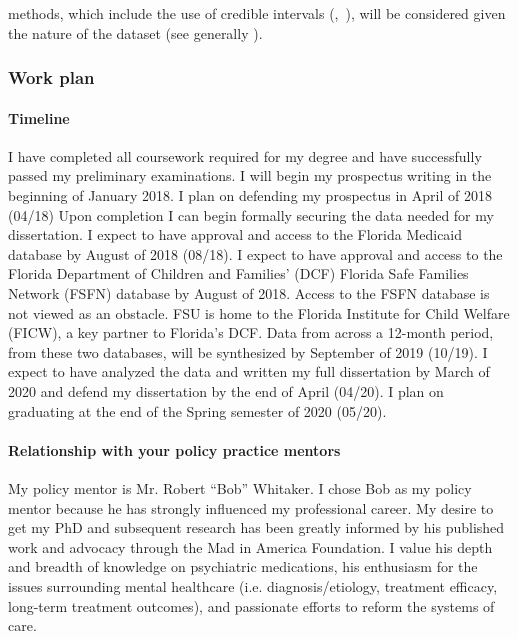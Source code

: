 \documentclass[twocolumn, issue, rga, authordate]{jote-new-article}
\begin{document}
methods, which include the use of credible intervals (,~\citeyear{Hoekstra2014}), will be considered given the nature of
the dataset (see generally  \citeyear{Berk1995}).


\subsubsection{Work plan}



\paragraph{Timeline}


I have completed all coursework required for my degree and have
successfully passed my preliminary examinations. I will begin my
prospectus writing in the beginning of January 2018. I plan on defending
my prospectus in April of 2018 (04/18) Upon completion I can begin
formally securing the data needed for my dissertation. I expect to have
approval and access to the Florida Medicaid database by August of 2018
(08/18). I expect to have approval and access to the Florida Department
of Children and Families' (DCF) Florida Safe Families Network (FSFN)
database by August of 2018. Access to the FSFN database is not viewed as
an obstacle. FSU is home to the Florida Institute for Child Welfare
(FICW), a key partner to Florida's DCF. Data from across a 12-month
period, from these two databases, will be synthesized by September of
2019 (10/19). I expect to have analyzed the data and written my full
dissertation by March of 2020 and defend my dissertation by the end of
April (04/20). I plan on graduating at the end of the Spring semester of
2020 (05/20).


\paragraph{Relationship with your policy practice mentors}


My policy mentor is Mr. Robert ``Bob'' Whitaker. I chose Bob as my
policy mentor because he has strongly influenced my professional career.
My desire to get my PhD and subsequent research has been greatly
informed by his published work and advocacy through the Mad in America
Foundation. I value his depth and breadth of knowledge on psychiatric
medications, his enthusiasm for the issues surrounding mental healthcare
(i.e. diagnosis/etiology, treatment efficacy, long-term treatment
outcomes), and passionate efforts to reform the systems of care.
\end{document}
